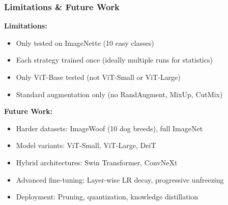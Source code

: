 \documentclass[aspectratio=169]{beamer}
\begin{document}
\begin{frame}
    \frametitle{Limitations \& Future Work}
    \small
    \textbf{Limitations:}
    \begin{itemize}
        \item Only tested on ImageNette (10 easy classes)
        \item Each strategy trained once (ideally multiple runs for statistics)
        \item Only ViT-Base tested (not ViT-Small or ViT-Large)
        \item Standard augmentation only (no RandAugment, MixUp, CutMix)
    \end{itemize}

    \vspace{0.15cm}

    \textbf{Future Work:}
    \begin{itemize}
        \item Harder datasets: ImageWoof (10 dog breeds), full ImageNet
        \item Model variants: ViT-Small, ViT-Large, DeiT
        \item Hybrid architectures: Swin Transformer, ConvNeXt
        \item Advanced fine-tuning: Layer-wise LR decay, progressive unfreezing
        \item Deployment: Pruning, quantization, knowledge distillation
    \end{itemize}
\end{frame}
\end{document}
